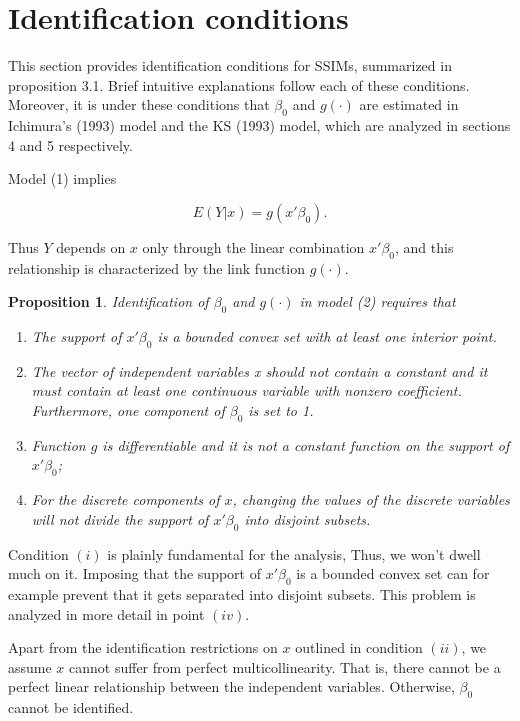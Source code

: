 \documentclass[a4paper]{article}
\begin{document}
\section{Identification conditions} %
\label{sec:Identification conditions}

This section provides identification conditions for SSIMs,  summarized in proposition 3.1. Brief intuitive explanations follow each of these conditions. Moreover, it is under these conditions that $\beta_0$ and $ g(\cdot)$ are estimated in Ichimura's (1993) \cite{[6]} model and the KS (1993) \cite{[12]} model, which are analyzed in sections 4 and 5 respectively.


Model (1) implies

\begin{equation}
E(Y|x) = g(x'\beta_0).
\end{equation}

Thus $Y$ depends on $x$ only through the linear combination $x'\beta_0$, and this relationship is characterized by the link function $g(\cdot)$. 


\newtheorem{prop}{Proposition}[section]

\begin{prop}
Identification of $\beta_0$ and $g(\cdot)$ in model (2) requires that
\begin{enumerate}[label=(\roman*)]
\item The support of $x'\beta_0$ is a bounded convex set with at least one interior point. 
\item The vector of independent variables x should not contain a constant and it must contain at least one continuous variable with nonzero coefficient. Furthermore, one component of $\beta_0$ is set to 1. 
\item Function $g$ is differentiable and it is not a constant function on the support of $x'\beta_0$;
\item For the discrete components of $x$, changing the values of the discrete variables will not divide the support of $x'\beta_0$ into disjoint subsets.
\end{enumerate}
\end{prop}

Condition $(i)$ is plainly fundamental for the analysis, Thus, we won't dwell much on it. Imposing that the support of $x'\beta_0$ is a bounded convex set can for example prevent that it gets separated into disjoint subsets. This problem is analyzed in more detail in point $(iv)$.

Apart from the identification restrictions on $x$ outlined in condition $(ii)$, we assume $x$ cannot suffer from perfect multicollinearity. That is, there cannot be a perfect linear relationship between the independent variables. Otherwise, $\beta_0$ cannot be identified.
\end{document}
